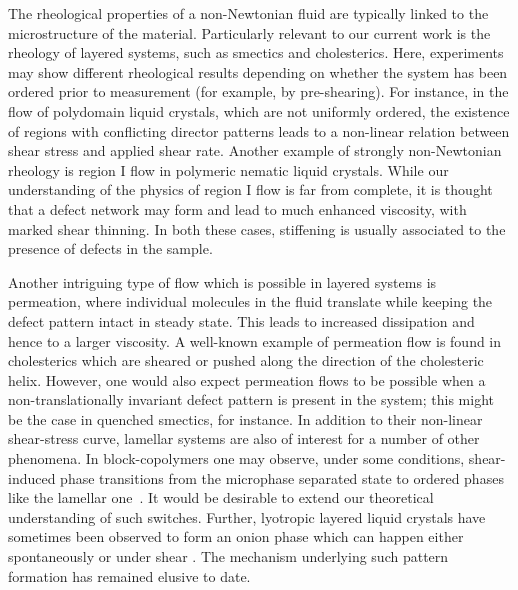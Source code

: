 \documentclass[8.5pt,twoside,twocolumn]{article}
\begin{document}
The rheological properties of a non-Newtonian fluid are typically linked
to the microstructure of the material. Particularly relevant to our
current work is the rheology of layered systems, such as smectics and
cholesterics. Here, experiments may show different rheological results
depending on whether the system has been ordered prior to measurement
(for example, by pre-shearing).
For instance, in the flow of polydomain liquid crystals, which are not
uniformly ordered, the existence of regions with conflicting director
patterns leads to a non-linear relation between shear stress and
applied shear rate.
Another example of strongly non-Newtonian rheology is region I flow
in polymeric nematic liquid crystals. While our understanding of the
physics of region I flow is far from complete, it is thought that a
defect network may form and lead to much enhanced viscosity, with
marked shear thinning. In both these cases, stiffening is usually
associated to the presence of defects in the sample.

Another intriguing type of flow which is possible in layered systems
is permeation,
where individual molecules in the fluid translate while keeping the
defect pattern intact in steady state. This leads to increased dissipation
and hence to a larger viscosity. A well-known example of permeation flow
is found in cholesterics which are sheared or pushed along the direction
of the cholesteric helix. However, one would also expect permeation flows
to be possible when a non-translationally invariant defect pattern is
present in the system; this might be the case in quenched smectics, for
instance. In addition to their non-linear shear-stress curve, lamellar
systems are also of interest for a number of other phenomena.
In block-copolymers one may observe, under some conditions, shear-induced
phase transitions from the microphase separated state to ordered phases
like the lamellar one~\cite{Cates89,Koppi93,Fredrickson94}. It would be
desirable to extend our theoretical understanding of such switches.
Further, lyotropic layered liquid crystals have sometimes been observed
to form an onion phase \cite{Panizza96,Iwashita07} which can happen either
spontaneously \cite{Gomati87,Boltenhagen92,Fournier94,Ramos04} or under
shear \cite{Diat93}. The mechanism underlying such pattern formation has
remained elusive to date.
\end{document}
